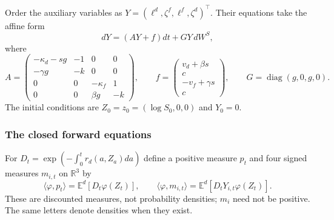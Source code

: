 Order the auxiliary variables as $Y=(\ell^d,\zeta^f,\ell^f,\zeta^d)^\top$.
Their equations take the affine form
\begin{equation}\label{eq: closureAffine}
dY=(AY+f)dt+GY\,dW^S,
\end{equation}
where
\[
A=\begin{pmatrix}
-\kappa_d-sg&-1&0&0\\
-\gamma g&-k&0&0\\
0&0&-\kappa_f&1\\
0&0&\beta g&-k
\end{pmatrix},\qquad
f=\begin{pmatrix}v_d+\beta s\\c\\-v_f+\gamma s\\c\end{pmatrix},
\qquad G=\operatorname{diag}(g,0,g,0).
\]
The initial conditions are $Z_0=z_0=(\log S_0,0,0)$ and $Y_0=0$.

\subsubsection{The closed forward equations}
For $D_t=\exp(-\int_0^t r_d(a,Z_a)da)$ define a positive measure $p_t$
and four signed measures $m_{i,t}$ on $\mathbb R^3$ by
\begin{equation}\label{eq: closureMeasures}
\langle\varphi,p_t\rangle=\mathbb E^d[D_t\varphi(Z_t)],\qquad
\langle\varphi,m_{i,t}\rangle=\mathbb E^d[D_tY_{i,t}\varphi(Z_t)].
\end{equation}
These are discounted measures, not probability densities; $m_i$ need not be
positive. The same letters denote densities when they exist.

